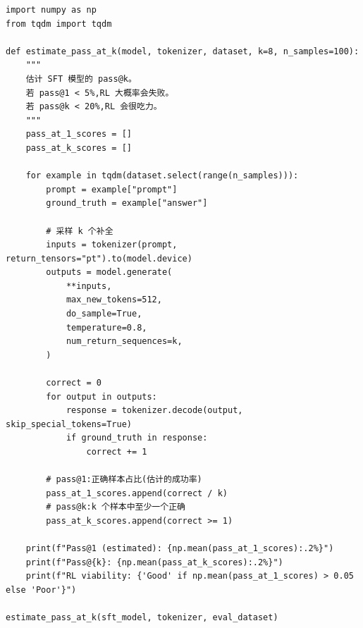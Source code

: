 \begin{examplebox}
\begin{lstlisting}[style=pythonstyle]
import numpy as np
from tqdm import tqdm

def estimate_pass_at_k(model, tokenizer, dataset, k=8, n_samples=100):
    """
    估计 SFT 模型的 pass@k。
    若 pass@1 < 5%,RL 大概率会失败。
    若 pass@k < 20%,RL 会很吃力。
    """
    pass_at_1_scores = []
    pass_at_k_scores = []

    for example in tqdm(dataset.select(range(n_samples))):
        prompt = example["prompt"]
        ground_truth = example["answer"]

        # 采样 k 个补全
        inputs = tokenizer(prompt, return_tensors="pt").to(model.device)
        outputs = model.generate(
            **inputs,
            max_new_tokens=512,
            do_sample=True,
            temperature=0.8,
            num_return_sequences=k,
        )

        correct = 0
        for output in outputs:
            response = tokenizer.decode(output, skip_special_tokens=True)
            if ground_truth in response:
                correct += 1

        # pass@1:正确样本占比(估计的成功率)
        pass_at_1_scores.append(correct / k)
        # pass@k:k 个样本中至少一个正确
        pass_at_k_scores.append(correct >= 1)

    print(f"Pass@1 (estimated): {np.mean(pass_at_1_scores):.2%}")
    print(f"Pass@{k}: {np.mean(pass_at_k_scores):.2%}")
    print(f"RL viability: {'Good' if np.mean(pass_at_1_scores) > 0.05 else 'Poor'}")

estimate_pass_at_k(sft_model, tokenizer, eval_dataset)
\end{lstlisting}
\end{examplebox}


